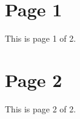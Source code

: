 \documentclass{article}
\begin{document}
\section{Page 1}
This is page 1 of 2.
\newpage
\section{Page 2}
This is page 2 of 2.
\end{document}
